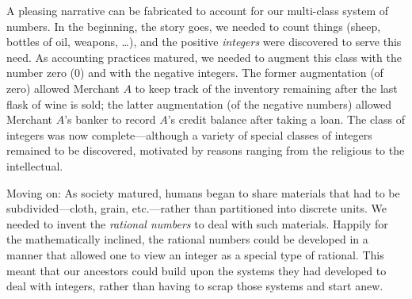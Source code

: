 \noindent {}

\bigskip

 
  

\noindent
A pleasing narrative can be fabricated to account for our multi-class system of numbers.  In the beginning, the story goes, we needed to count things (sheep, bottles of oil, weapons, \ldots), and the positive {\it integers} were discovered to serve this need.  As accounting practices matured, we needed to augment this class with the number zero ($0$) and with the negative integers.  The former augmentation (of zero) allowed Merchant $A$ to keep track of the inventory remaining after the last flask of wine is sold; the latter augmentation (of the negative numbers) allowed Merchant $A$'s banker to record $A$'s credit balance after taking a loan.  The class of integers was now complete---although a variety of special classes of integers remained to be discovered, motivated by reasons ranging from the religious to the intellectual.


Moving on: As society matured, humans began to share materials that had to be subdivided---cloth, grain, etc.---rather than partitioned into discrete units.  We needed to invent the {\it rational numbers} to deal with such materials.  Happily for the mathematically inclined, the rational numbers could be developed in a manner that allowed one to view an integer as a special type of rational.  This meant that our ancestors could build upon the systems they had developed to deal with integers, rather than having to scrap those systems and start anew.

